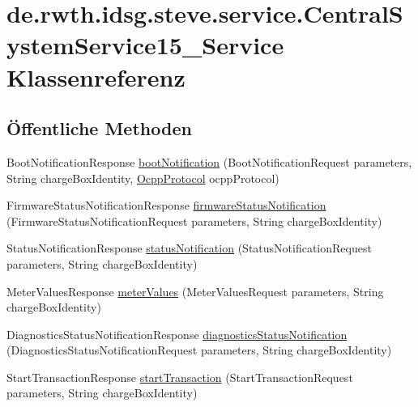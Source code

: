 \hypertarget{classde_1_1rwth_1_1idsg_1_1steve_1_1service_1_1_central_system_service15___service}{\section{de.\-rwth.\-idsg.\-steve.\-service.\-Central\-System\-Service15\-\_\-\-Service Klassenreferenz}
\label{classde_1_1rwth_1_1idsg_1_1steve_1_1service_1_1_central_system_service15___service}
}
\subsection*{Öffentliche Methoden}
\begin{DoxyCompactItemize}
\item 
Boot\-Notification\-Response \hyperlink{classde_1_1rwth_1_1idsg_1_1steve_1_1service_1_1_central_system_service15___service_acf877d4da5a9435a884b929f68530a44}{boot\-Notification} (Boot\-Notification\-Request parameters, String charge\-Box\-Identity, \hyperlink{enumde_1_1rwth_1_1idsg_1_1steve_1_1ocpp_1_1_ocpp_protocol}{Ocpp\-Protocol} ocpp\-Protocol)
\item 
Firmware\-Status\-Notification\-Response \hyperlink{classde_1_1rwth_1_1idsg_1_1steve_1_1service_1_1_central_system_service15___service_ac5062e047ef689c5526f49f8ec4e9b4a}{firmware\-Status\-Notification} (Firmware\-Status\-Notification\-Request parameters, String charge\-Box\-Identity)
\item 
Status\-Notification\-Response \hyperlink{classde_1_1rwth_1_1idsg_1_1steve_1_1service_1_1_central_system_service15___service_ab545723c39a68c74ea5d3704f02bb9a9}{status\-Notification} (Status\-Notification\-Request parameters, String charge\-Box\-Identity)
\item 
Meter\-Values\-Response \hyperlink{classde_1_1rwth_1_1idsg_1_1steve_1_1service_1_1_central_system_service15___service_a447c6b35033475a8e40f45312dff7d47}{meter\-Values} (Meter\-Values\-Request parameters, String charge\-Box\-Identity)
\item 
Diagnostics\-Status\-Notification\-Response \hyperlink{classde_1_1rwth_1_1idsg_1_1steve_1_1service_1_1_central_system_service15___service_a6fd6b72c9efd177f191088b2c9232a97}{diagnostics\-Status\-Notification} (Diagnostics\-Status\-Notification\-Request parameters, String charge\-Box\-Identity)
\item 
Start\-Transaction\-Response \hyperlink{classde_1_1rwth_1_1idsg_1_1steve_1_1service_1_1_central_system_service15___service_a62d29dc8a9bfe8a11e395d88b57d75f9}{start\-Transaction} (Start\-Transaction\-Request parameters, String charge\-Box\-Identity)

\end{DoxyCompactItemize}
